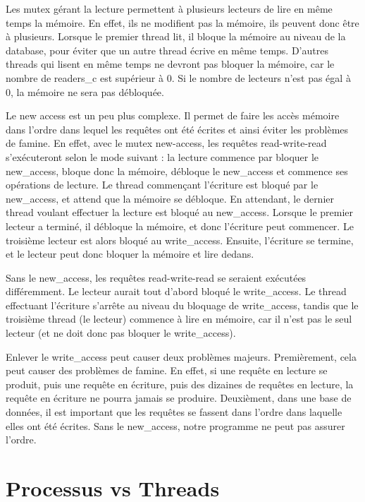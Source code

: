 \documentclass[utf8]{article}
\begin{document}
\begin{large}
\par
Les mutex gérant la lecture permettent à plusieurs lecteurs de lire en même temps la
mémoire. En effet, ils ne modifient pas la mémoire, ils peuvent donc être à
plusieurs. Lorsque le premier thread lit, il bloque la mémoire au niveau de la
database, pour éviter que un autre thread écrive en même temps. D'autres threads
qui lisent en même temps ne devront pas bloquer la mémoire, car le nombre de
readers\_c est supérieur à 0. Si le nombre de lecteurs n'est pas égal à 0,
la mémoire ne sera pas débloquée.
\par
Le new access est un peu plus complexe. Il permet de faire les accès mémoire
dans l'ordre dans lequel les requêtes ont été écrites et ainsi éviter les problèmes de
famine. En effet, avec le mutex new-access, les requêtes read-write-read s'exécuteront selon le mode suivant : la lecture commence par
bloquer le new\_access, bloque donc la mémoire, débloque le new\_access et
commence ses opérations de lecture. Le thread commençant l'écriture est bloqué par le
new\_access, et attend que la mémoire se débloque. En attendant, le dernier
thread voulant effectuer la lecture est bloqué au new\_access. Lorsque le
premier lecteur a terminé, il débloque la mémoire, et donc l'écriture peut
commencer. Le troisième lecteur est alors bloqué au write\_access. Ensuite,
l'écriture se termine, et le lecteur peut donc bloquer la mémoire et lire dedans.
\par
Sans le new\_access, les requêtes read-write-read se seraient
exécutées différemment. Le lecteur aurait tout d'abord bloqué le write\_access.
Le thread effectuant l'écriture s'arrête au niveau du bloquage de
write\_access, tandis que le troisième thread (le lecteur) commence à lire en
mémoire, car il n'est pas le seul lecteur (et ne doit donc pas bloquer le
write\_access).
\par
Enlever le write\_access peut causer deux problèmes majeurs. Premièrement, cela
peut causer des problèmes de famine. En effet, si une requête en lecture se
produit, puis une requête en écriture, puis des dizaines de requêtes en lecture,
la requête en écriture ne pourra jamais se produire. Deuxièment, dans une base
de données, il est important que les requêtes se fassent dans l'ordre dans
laquelle elles ont été écrites. Sans le new\_access, notre programme ne peut pas
assurer l'ordre.
\par
\section{Processus vs Threads}
\par
\indent


\end{large}
\end{document}
